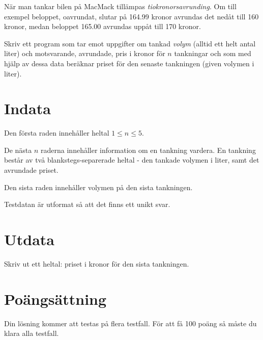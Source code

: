
När man tankar bilen på MacMack tillämpas \emph{tiokronorsavrunding}. Om till exempel beloppet, oavrundat, slutar på
164.99 kronor avrundas det nedåt till 160 kronor, medan beloppet 165.00 avrundas uppåt till 170 kronor.

Skriv ett program som tar emot uppgifter om tankad \emph{volym} (alltid ett helt antal liter) och motsvarande,
avrundade, pris i kronor för $n$ tankningar och som med hjälp av dessa data beräknar priset för den senaste tankningen
(given volymen i liter).

\section*{Indata}
Den första raden innehåller heltal $1 \le n \le 5$. 

De nästa $n$ raderna innehåller information om en tankning vardera. En tankning består av två blankstegs-separerade heltal - den tankade volymen i liter,
samt det avrundade priset.

Den sista raden innehåller volymen på den sista tankningen.

Testdatan är utformat så att det finns ett unikt svar.

\section*{Utdata}
Skriv ut ett heltal: priset i kronor för den sista tankningen.

\section*{Poängsättning}
Din lösning kommer att testas på flera testfall. För att få 100 poäng så måste du klara alla testfall.
